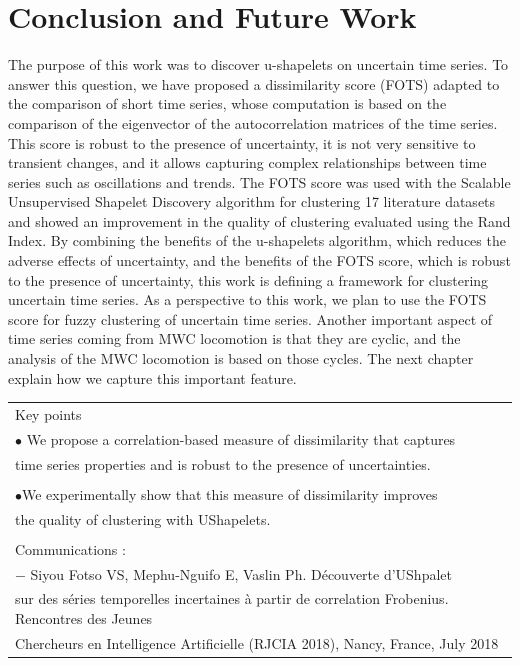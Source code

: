 \section[Conclusion]{Conclusion and Future Work}
The purpose of this work was to discover u-shapelets on uncertain time series. To answer this question, we have proposed a dissimilarity score (FOTS) adapted to the comparison of short time series, whose computation is based on the comparison of the eigenvector of the autocorrelation matrices of the time series. This score is robust to the presence of uncertainty, it is not very sensitive to transient changes, and it allows capturing complex relationships between time series such as oscillations and trends. The FOTS score was used with the Scalable Unsupervised Shapelet Discovery algorithm for clustering 17 literature datasets and showed an improvement in the quality of clustering evaluated using the Rand Index.  By combining the benefits of the u-shapelets algorithm, which reduces the adverse effects of uncertainty, and the benefits of the FOTS score, which is robust to the presence of uncertainty, this work is defining a framework for clustering uncertain time series. As a perspective to this work, we plan to use the FOTS score for fuzzy clustering of uncertain time series. Another important aspect of time series coming from MWC locomotion is that they are cyclic, and the analysis of the MWC  locomotion is based on those cycles. The next chapter explain how we capture this important feature.


\begin{table}[ht]
\centering
\begin{tabular}{|l|}

\hline
\rowcolor{LavenderBlush}
Key points\\
$\bullet$ We propose a correlation-based measure of dissimilarity that captures\\ time series properties and is robust to the presence of uncertainties. \\
\\
$\bullet$We experimentally show that this measure of dissimilarity improves \\the quality of clustering with UShapelets.\\ 
\\
Communications :\\
$-$ Siyou Fotso VS, Mephu-Nguifo E, Vaslin Ph. Découverte d'UShpalet\\ sur des séries temporelles incertaines à partir de correlation Frobenius. Rencontres des Jeunes\\ Chercheurs en Intelligence Artificielle (RJCIA 2018), Nancy, France, July 2018\\
\hline
\end{tabular}
\end{table}